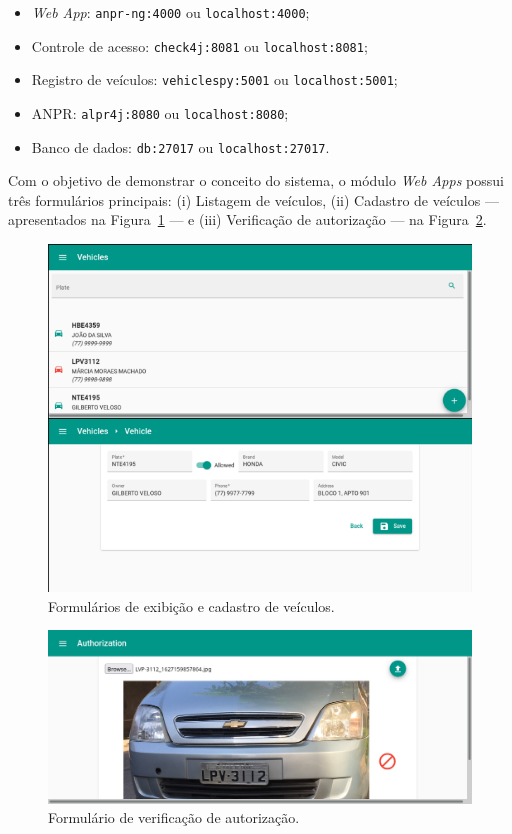 \documentclass[12pt]{article}
\begin{document}
\begin{itemize}
\item \textit{Web App}: \texttt{anpr-ng:4000} ou \texttt{localhost:4000};
\item Controle de acesso: \texttt{check4j:8081} ou \texttt{localhost:8081};
\item Registro de veículos: \texttt{vehiclespy:5001} ou \texttt{localhost:5001};
\item ANPR: \texttt{alpr4j:8080} ou \texttt{localhost:8080};
\item Banco de dados: \texttt{db:27017} ou \texttt{localhost:27017}.
\end{itemize}

Com o objetivo de demonstrar o conceito do sistema, o módulo \textit{Web Apps} possui três formulários principais: (i) Listagem de veículos, (ii) Cadastro de veículos — apresentados na Figura~\ref{fig:vehicles-forms} — e (iii) Verificação de autorização — na Figura~\ref{fig:check-form}.

\begin{figure}[ht]
	\centering
	\includegraphics[width=.9\textwidth]{vehicles-forms.png}
	\caption{Formulários de exibição e cadastro de veículos.}
	\label{fig:vehicles-forms}
\end{figure}

\begin{figure}[ht]
	\centering
	\includegraphics[width=.9\textwidth]{check-form.png}
	\caption{Formulário de verificação de autorização.}
	\label{fig:check-form}
\end{figure}
\end{document}
